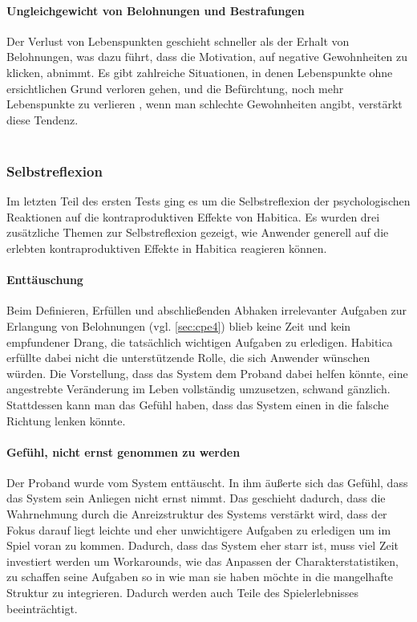 \documentclass[sigconf, nonacm]{acmart}
\begin{document}
\paragraph{Ungleichgewicht von Belohnungen und Bestrafungen}\label{sec:acpe4}
Der Verlust von Lebenspunkten geschieht schneller als der Erhalt von Belohnungen, was dazu führt, dass die Motivation, auf negative Gewohnheiten zu klicken, abnimmt. Es gibt zahlreiche Situationen, in denen Lebenspunkte ohne ersichtlichen Grund verloren gehen, und die Befürchtung, noch mehr Lebenspunkte zu verlieren , wenn man schlechte Gewohnheiten angibt, verstärkt diese Tendenz. 
\\
\\
\subsubsection{Selbstreflexion}
Im letzten Teil des ersten Tests ging es um die Selbstreflexion der psychologischen Reaktionen auf die kontraproduktiven Effekte von Habitica. Es wurden drei zusätzliche Themen zur Selbstreflexion gezeigt, wie Anwender generell auf die erlebten kontraproduktiven Effekte in Habitica reagieren können.

\paragraph{Enttäuschung}\label{sec:sr1}
Beim Definieren, Erfüllen und abschließenden Abhaken irrelevanter Aufgaben zur Erlangung von Belohnungen (vgl. \ref{sec:cpe4}) blieb keine Zeit und kein empfundener Drang, die tatsächlich wichtigen Aufgaben zu erledigen. Habitica erfüllte dabei nicht die unterstützende Rolle, die sich Anwender wünschen würden. Die Vorstellung, dass das System dem Proband dabei helfen könnte, eine angestrebte Veränderung im Leben vollständig umzusetzen, schwand gänzlich. Stattdessen kann man das Gefühl haben, dass das System einen in die falsche Richtung lenken könnte.

\paragraph{Gefühl, nicht ernst genommen zu werden}\label{sec:sr2}
Der Proband wurde vom System enttäuscht. In ihm äußerte sich das Gefühl, dass das System sein Anliegen nicht ernst nimmt. Das geschieht dadurch, dass die Wahrnehmung durch die Anreizstruktur des Systems verstärkt wird, dass der Fokus darauf liegt leichte und eher unwichtigere Aufgaben zu erledigen um im Spiel voran zu kommen. 
Dadurch, dass das System eher starr ist, muss viel Zeit investiert werden um Workarounds, wie das Anpassen der Charakterstatistiken, zu schaffen seine Aufgaben so in wie man sie haben möchte in die mangelhafte Struktur zu integrieren. Dadurch werden auch Teile des Spielerlebnisses beeinträchtigt.
\end{document}
